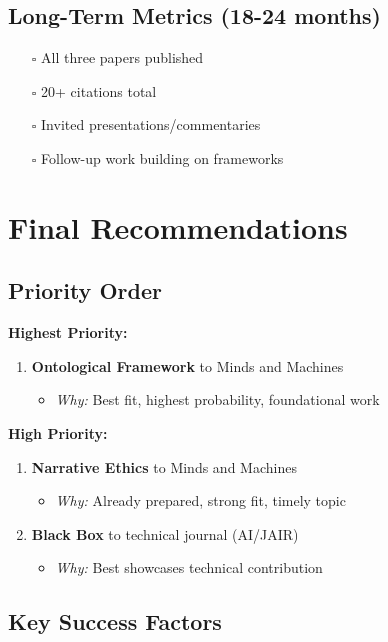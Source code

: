 \documentclass[12pt]{article}
\begin{document}
\subsection{Long-Term Metrics (18-24 months)}

\begin{itemize}[leftmargin=*]
\item[$\square$] All three papers published
\item[$\square$] 20+ citations total
\item[$\square$] Invited presentations/commentaries
\item[$\square$] Follow-up work building on frameworks
\end{itemize}

\section{Final Recommendations}

\subsection{Priority Order}

\textbf{Highest Priority:}
\begin{enumerate}
\item \textbf{Ontological Framework} to Minds and Machines
   \begin{itemize}
   \item \textit{Why:} Best fit, highest probability, foundational work
   \end{itemize}
\end{enumerate}

\textbf{High Priority:}
\begin{enumerate}[resume]
\item \textbf{Narrative Ethics} to Minds and Machines
   \begin{itemize}
   \item \textit{Why:} Already prepared, strong fit, timely topic
   \end{itemize}

\item \textbf{Black Box} to technical journal (AI/JAIR)
   \begin{itemize}
   \item \textit{Why:} Best showcases technical contribution
   \end{itemize}
\end{enumerate}

\subsection{Key Success Factors}
\end{document}
